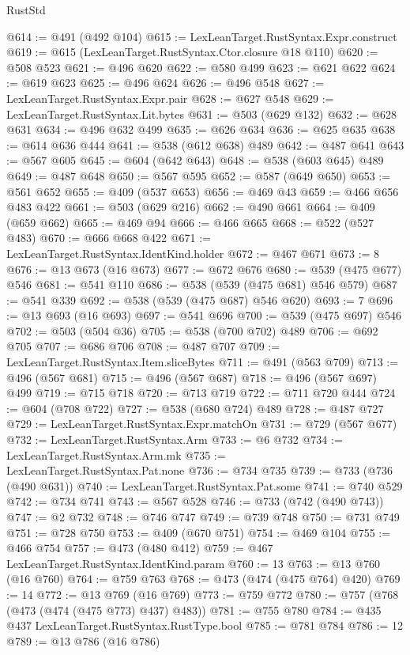 \begin{lexlean}{RustStd}
\begin{coremodule}
@614 := @491 (@492 @104)
@615 := LexLeanTarget.RustSyntax.Expr.construct
@619 := @615 (LexLeanTarget.RustSyntax.Ctor.closure @18 @110)
@620 := @508 @523
@621 := @496 @620
@622 := @580 @499
@623 := @621 @622
@624 := @619 @623
@625 := @496 @624
@626 := @496 @548
@627 := LexLeanTarget.RustSyntax.Expr.pair
@628 := @627 @548
@629 := LexLeanTarget.RustSyntax.Lit.bytes
@631 := @503 (@629 @132)
@632 := @628 @631
@634 := @496 @632 @499
@635 := @626 @634
@636 := @625 @635
@638 := @614 @636 @444
@641 := @538 (@612 @638) @489
@642 := @487 @641
@643 := @567 @605
@645 := @604 (@642 @643)
@648 := @538 (@603 @645) @489
@649 := @487 @648
@650 := @567 @595
@652 := @587 (@649 @650)
@653 := @561 @652
@655 := @409 (@537 @653)
@656 := @469 @43
@659 := @466 @656 @483 @422
@661 := @503 (@629 @216)
@662 := @490 @661
@664 := @409 (@659 @662)
@665 := @469 @94
@666 := @466 @665
@668 := @522 (@527 @483)
@670 := @666 @668 @422
@671 := LexLeanTarget.RustSyntax.IdentKind.holder
@672 := @467 @671
@673 := 8
@676 := @13 @673 (@16 @673)
@677 := @672 @676
@680 := @539 (@475 @677) @546
@681 := @541 @110
@686 := @538 (@539 (@475 @681) @546 @579)
@687 := @541 @339
@692 := @538 (@539 (@475 @687) @546 @620)
@693 := 7
@696 := @13 @693 (@16 @693)
@697 := @541 @696
@700 := @539 (@475 @697) @546
@702 := @503 (@504 @36)
@705 := @538 (@700 @702) @489
@706 := @692 @705
@707 := @686 @706
@708 := @487 @707
@709 := LexLeanTarget.RustSyntax.Item.sliceBytes
@711 := @491 (@563 @709)
@713 := @496 (@567 @681)
@715 := @496 (@567 @687)
@718 := @496 (@567 @697) @499
@719 := @715 @718
@720 := @713 @719
@722 := @711 @720 @444
@724 := @604 (@708 @722)
@727 := @538 (@680 @724) @489
@728 := @487 @727
@729 := LexLeanTarget.RustSyntax.Expr.matchOn
@731 := @729 (@567 @677)
@732 := LexLeanTarget.RustSyntax.Arm
@733 := @6 @732
@734 := LexLeanTarget.RustSyntax.Arm.mk
@735 := LexLeanTarget.RustSyntax.Pat.none
@736 := @734 @735
@739 := @733 (@736 (@490 @631))
@740 := LexLeanTarget.RustSyntax.Pat.some
@741 := @740 @529
@742 := @734 @741
@743 := @567 @528
@746 := @733 (@742 (@490 @743))
@747 := @2 @732
@748 := @746 @747
@749 := @739 @748
@750 := @731 @749
@751 := @728 @750
@753 := @409 (@670 @751)
@754 := @469 @104
@755 := @466 @754
@757 := @473 (@480 @412)
@759 := @467 LexLeanTarget.RustSyntax.IdentKind.param
@760 := 13
@763 := @13 @760 (@16 @760)
@764 := @759 @763
@768 := @473 (@474 (@475 @764) @420)
@769 := 14
@772 := @13 @769 (@16 @769)
@773 := @759 @772
@780 := @757 (@768 (@473 (@474 (@475 @773) @437) @483))
@781 := @755 @780
@784 := @435 @437 LexLeanTarget.RustSyntax.RustType.bool
@785 := @781 @784
@786 := 12
@789 := @13 @786 (@16 @786)

\end{coremodule}
\end{lexlean}
